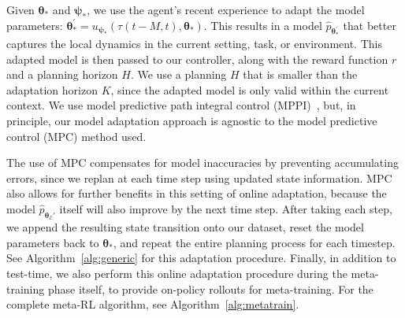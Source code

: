 Given  $\bm{\theta}_*$ and $ \bm{\psi}_*$, we use the agent's recent experience to adapt the model parameters: $\bm{\theta}_*^\prime = u_{\bm{\psi}_*}(\tau(t-M, t), \bm{\theta}_*)$. This results in a model $\hat{p}_{\bm{\theta_*^\prime}}$ that better captures the local dynamics in the current setting, task, or environment. This adapted model is then passed to our controller, along with the reward function $r$ and a planning horizon $H$. We use a planning $H$ that is smaller than the adaptation horizon $K$, since the adapted model is only valid within the current context. We use model predictive path integral control (MPPI)~\citep{williams15mppi}, but, in principle, our model adaptation approach is agnostic to the model predictive control (MPC) method used.

The use of MPC compensates for model inaccuracies by preventing accumulating errors, since we replan at each time step using updated state information. MPC also allows for further benefits in this setting of online adaptation, because the model $\hat p_{\bm{\theta}_\mathcal{E}'}$ itself will also improve by the next time step. After taking each step, we append the resulting state transition onto our dataset, reset the model parameters back to $\bm{\theta}_*$, and repeat the entire planning process for each timestep. See Algorithm~\ref{alg:generic} for this adaptation procedure. Finally, in addition to test-time, we also perform this online adaptation procedure during the meta-training phase itself, to provide on-policy rollouts for meta-training. For the complete meta-RL algorithm, see  Algorithm~\ref{alg:metatrain}.
